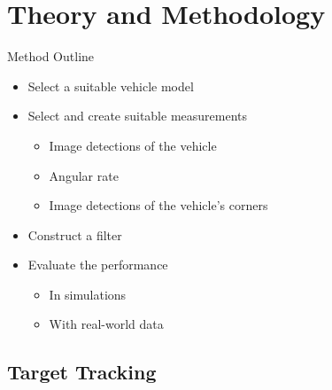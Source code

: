 \documentclass{beamer}
\begin{document}
\section{Theory and Methodology}

\begin{frame}{Method Outline}
	\begin{itemize}
		\item Select a suitable vehicle model
		\item Select and create suitable measurements
		\begin{itemize}
			\item Image detections of the vehicle
			\item Angular rate
			\item Image detections of the vehicle's corners
		\end{itemize}
		\item Construct a filter
		\item Evaluate the performance
		\begin{itemize}
			\item In simulations
			\item With real-world data
		\end{itemize}
	\end{itemize}
\end{frame}

\subsection{Target Tracking}
\end{document}
